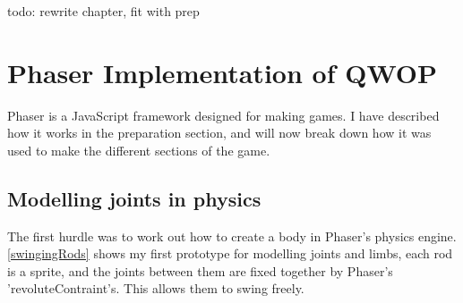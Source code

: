 \documentclass[12pt,a4paper,twoside,openright]{report}
\begin{document}
todo: rewrite chapter, fit with prep



\section{Phaser Implementation of QWOP}
\label{sec:qwopImp}
Phaser is a JavaScript framework designed for making games. I have described how it works in the preparation section, and will now break down how it was used to make the different sections of the game.


\subsection{Modelling joints in physics}
\label{sec:jointsInPhysics}
The first hurdle was to work out how to create a body in Phaser's physics engine.   
\ref{swingingRods} shows my first prototype for modelling joints and limbs, each rod is a sprite, and the joints between them are fixed together by Phaser's 'revoluteContraint's. This allows them to swing freely.
\end{document}
